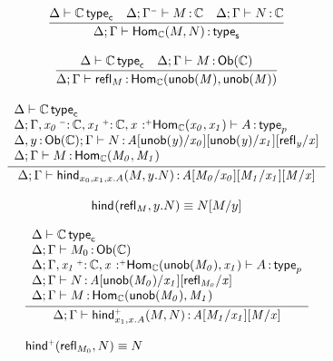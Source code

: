 \documentclass[11pt]{article}
\theoremstyle{plain}
\begin{document}
\[
\begin{array}{c}
\infer{\wftpsf{\Delta}{\Gamma}{\Hom{\C}{M}{N}}}
      {\wftpcc{\Delta}{\C} &
        \oftpsf{\Delta}{\Gamma^\con}{M}{\C} & 
        \oftpsf{\Delta}{\Gamma}{N}{\C} 
      }
\\ \\
\infer{\oftpsf{\Delta}{\Gamma}{\refl{M}}{\Hom{\C}{\unob M}{\unob M}}}
      {\wftpcc{\Delta}{\C} &
        \oftpsf{\Delta}{\Gamma}{M}{\obtp{\C}}
      }
\\ \\
\infer{\oftpsf{\Delta}{\Gamma}{\morind{x_0,x_1,x.A}{M}{y.N}}{\subst{\subst{\subst{A}{M_0}{x_0}}{M_1}{x_1}}{M}{x}}}
      { \begin{array}{l}
          \wftpcc{\Delta}{\C} \\
          \wftpp{\Delta}{\Gamma,\vptptm{x_0}{\con}{\C},\vptptm{x_1}{\co}{\C},\vstptm{x}{\co}{\Hom{\C}{x_0}{x_1}}}{A} \\
          \oftpp{\Delta,\tptm{y}{\obtp{\C}}}{\Gamma}{N}{\subst{\subst{\subst{A}{\unob{y}}{x_0}}{\unob{y}}{x_1}}{\refl{y}}{x}} \\
          \oftpsf{\Delta}{\Gamma}{M}{\Hom{\C}{M_0}{M_1}} \\
        \end{array}
      }
\\ \\
\morind{}{\refl{M}}{y.N} \deq \subst{N}{M}{y}
\end{array}
\]


\[
\begin{array}{l}
\infer{\oftpsf{\Delta}{\Gamma}{\morindco{x_1,x.A}{M}{N}}{\subst{\subst{A}{M_1}{x_1}}{M}{x}}}
      { \begin{array}{l}
          \wftpcc{\Delta}{\C} \\
          \oftpp{\Delta}{\Gamma}{M_0}{\obtp \C} \\
          \wftpp{\Delta}{\Gamma,\vptptm{x_1}{\co}{\C},\vstptm{x}{\co}{\Hom{\C}{\unob{M_0}}{x_1}}}{A} \\
          \oftpp{\Delta}{\Gamma}{N}{\subst{\subst{A}{\unob{M_0}}{x_1}}{\refl{M_0}}{x}} \\
          \oftpsf{\Delta}{\Gamma}{M}{\Hom{\C}{\unob{M_0}}{M_1}} \\
        \end{array}
      }
\\ \\
\morindco{}{\refl{M_0}}{N} \deq N
\end{array}
\]
\end{document}
